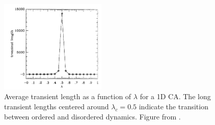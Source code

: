 \documentclass[a4paper,11pt]{article}
\begin{document}
\begin{figure}[htp]
\centering
\includegraphics[width=0.45\textwidth]{la90_fig3_lambda_transient_len.png}
\caption[Lambda and Transient Length]{
Average transient length as a function of $\lambda$ for a 1D CA. The long transient lengths centered around $\lambda_c=0.5$ indicate the transition between ordered and disordered dynamics. Figure from \citeauthor{la90} \cite{la90}.
}
\label{fig:lambda_trans}
\end{figure}


\end{document}
